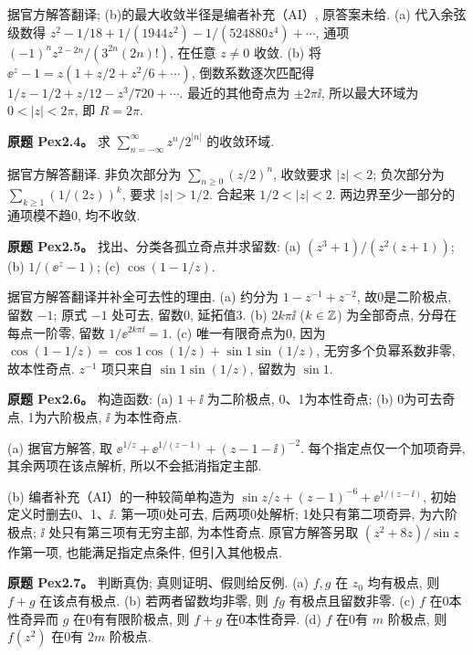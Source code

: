 \begin{solution}
据官方解答翻译; (b)的最大收敛半径是编者补充（AI）, 原答案未给. (a) 代入余弦级数得 $z^2-1/18+1/(1944z^2)-1/(524880z^4)+\cdots$, 通项 $(-1)^n z^{2-2n}/(3^{2n}(2n)!)$, 在任意 $z\ne0$ 收敛. (b) 将 $\ee^z-1=z(1+z/2+z^2/6+\cdots)$, 倒数系数逐次匹配得 $1/z-1/2+z/12-z^3/720+\cdots$. 最近的其他奇点为 $\pm2\pi\ii$, 所以最大环域为 $0<|z|<2\pi$, 即 $R=2\pi$.
\end{solution}
\begin{exercise}\label{ass:pex2-4}
\textbf{原题 Pex2.4。} 求 $\sum_{n=-\infty}^{\infty}z^n/2^{|n|}$ 的收敛环域.
\end{exercise}
\begin{solution}据官方解答翻译. 非负次部分为 $\sum_{n\ge0}(z/2)^n$, 收敛要求 $|z|<2$; 负次部分为 $\sum_{k\ge1}(1/(2z))^k$, 要求 $|z|>1/2$. 合起来 $1/2<|z|<2$. 两边界至少一部分的通项模不趋0, 均不收敛.\end{solution}
\begin{exercise}\label{ass:pex2-5}
\textbf{原题 Pex2.5。} 找出、分类各孤立奇点并求留数: (a) $(z^3+1)/(z^2(z+1))$; (b) $1/(\ee^z-1)$; (c) $\cos(1-1/z)$.
\end{exercise}
\begin{solution}
据官方解答翻译并补全可去性的理由. (a) 约分为 $1-z^{-1}+z^{-2}$, 故0是二阶极点, 留数 $-1$; 原式 $-1$ 处可去, 留数0, 延拓值3. (b) $2k\pi\ii$ ($k\in\mathbb Z$) 为全部奇点, 分母在每点一阶零, 留数 $1/\ee^{2k\pi\ii}=1$. (c) 唯一有限奇点为0, 因为 $\cos(1-1/z)=\cos1\cos(1/z)+\sin1\sin(1/z)$, 无穷多个负幂系数非零, 故本性奇点. $z^{-1}$ 项只来自 $\sin1\sin(1/z)$, 留数为 $\sin1$.
\end{solution}
\begin{exercise}\label{ass:pex2-6}
\textbf{原题 Pex2.6。} 构造函数: (a) $1+\ii$ 为二阶极点, 0、1为本性奇点; (b) 0为可去奇点, 1为六阶极点, $\ii$ 为本性奇点.
\end{exercise}
\begin{solution}
(a) 据官方解答, 取 $\ee^{1/z}+\ee^{1/(z-1)}+(z-1-\ii)^{-2}$. 每个指定点仅一个加项奇异, 其余两项在该点解析, 所以不会抵消指定主部.

(b) 编者补充（AI）的一种较简单构造为 $\sin z/z+(z-1)^{-6}+\ee^{1/(z-\ii)}$, 初始定义时删去0、1、$\ii$. 第一项0处可去, 后两项0处解析; 1处只有第二项奇异, 为六阶极点; $\ii$ 处只有第三项有无穷主部, 为本性奇点. 原官方解答另取 $(z^2+8z)/\sin z$ 作第一项, 也能满足指定点条件, 但引入其他极点.
\end{solution}
\begin{exercise}\label{ass:pex2-7}
\textbf{原题 Pex2.7。} 判断真伪; 真则证明、假则给反例. (a) $f,g$ 在 $z_0$ 均有极点, 则 $f+g$ 在该点有极点. (b) 若两者留数均非零, 则 $fg$ 有极点且留数非零. (c) $f$ 在0本性奇异而 $g$ 在0有有限阶极点, 则 $f+g$ 在0本性奇异. (d) $f$ 在0有 $m$ 阶极点, 则 $f(z^2)$ 在0有 $2m$ 阶极点.
\end{exercise}
